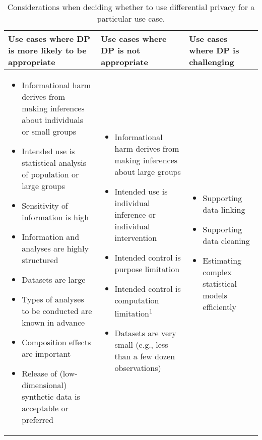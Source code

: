 
\newcommand*{\thead}[1]{\bfseries\hspace*{\fill}{#1}\hspace*{\fill}}
\begin{center}
\begin{table}[H]
\caption{\label{table:dp_usecases} Considerations when deciding whether to use differential privacy for a particular use case.}
\fontsize{8}{9}\selectfont
\begin{tabularx}{1\textwidth}{YYY}
\toprule
Use cases where DP is more likely to be appropriate & Use cases where DP is not appropriate & Use cases where DP is challenging \\
\midrule
\begin{itemize}
\item Informational harm derives from making inferences about individuals or small groups
\item Intended use is statistical analysis of population or large groups
\item Sensitivity of information is high
\item Information and analyses are highly structured
\item Datasets are large
\item Types of analyses to be conducted are known in advance
\item Composition effects are important
\item Release of (low-dimensional) synthetic data is acceptable or preferred
\end{itemize}
&
\begin{itemize}
\item Informational harm derives from making inferences about large groups
\item Intended use is individual inference or individual intervention
\item Intended control is purpose limitation
\item Intended control is computation limitation\textsuperscript{1}
\item Datasets are very small (e.g., less than a few dozen observations)
\end{itemize}
&
\begin{itemize}
    \item Supporting data linking
    \item Supporting data cleaning
    \item Estimating complex statistical models efficiently

\end{itemize}
\end{tabularx}
\end{table}
\end{center}
